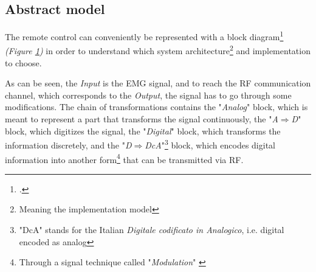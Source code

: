 \documentclass[a4paper, 10pt, final]{article} %
\newcommand{\InvisibleBorder}{
    (current bounding box.south west) ++($(-\fboxsep, -\fboxsep)-(0.5,0.5)$) coordinate (ll)
    (current bounding box.north east) ++($(\fboxsep, \fboxsep)+(0.5,0.5)$) coordinate (ur)
}
\begin{document}
    \subsection{Abstract model}\label{sec:ProjectDesignAbstractModel}
    The remote control can conveniently be represented with a block diagram\footcite[]{BlockDiagram:Wiki} \emph{(Figure \ref{fig:BlockDiagram})} in order to understand which system architecture\footnote{Meaning the implementation model} and implementation to choose.
    \begin{figure}[H]
        \centering
        \caption{}
        \label{fig:BlockDiagram}
    \end{figure}
    As can be seen, the \emph{Input} is the EMG signal, and to reach the RF communication channel, which corresponds to the \emph{Output}, the signal has to go through some modifications.
    The chain of transformations contains the "\emph{Analog}" block, which is meant to represent a part that transforms the signal continuously, the "\emph{A$\Rightarrow$D}" block, which digitizes the signal, the "\emph{Digital}" block, which transforms the information discretely, and the "\emph{D$\Rightarrow$DcA}"\footnote{"DcA" stands for the Italian \emph{Digitale codificato in Analogico}, i.e. digital encoded as analog} block, which encodes digital information into another form\footnote{Through a signal technique called "\emph{Modulation}" \parencite[]{Modulation:Wiki}} that can be transmitted via RF.
\end{document}
